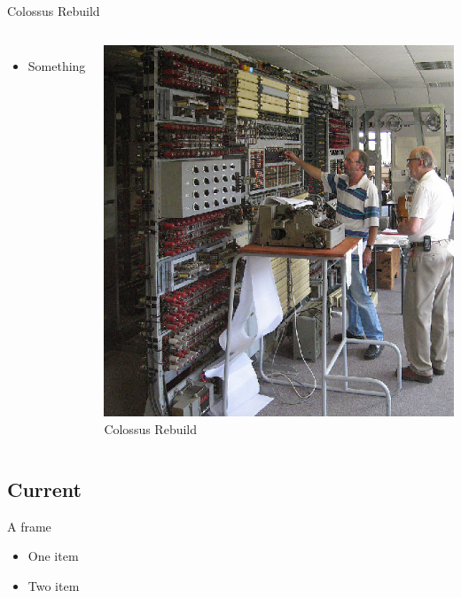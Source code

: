 \documentclass{beamer}
\begin{document}
\begin{frame}{Colossus Rebuild}
  \begin{columns}
    
    \begin{itemize}
    \item
      Something
      
    \end{itemize}
    
    \begin{center}
      \includegraphics[scale=0.4]{../assets/ColossusRebuild_11.eps}
      \cite{ColossusRebuild} Colossus Rebuild
    \end{center}
    
  \end{columns}
\end{frame}


\subsection[Modern]{Current}

\begin{frame}{A frame}
  \begin{itemize}
  \item
    One item
  \item
    Two item
  \end{itemize}
\end{frame}
\end{document}

